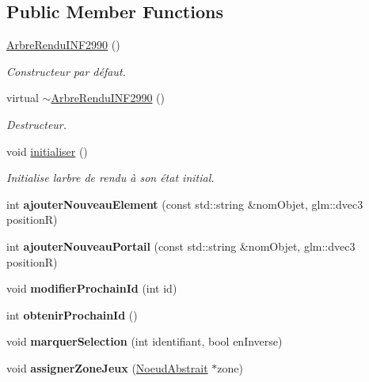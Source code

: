 \subsection*{Public Member Functions}
\begin{DoxyCompactItemize}
\item 
\hyperlink{group__inf2990_ga67528b7fa54e8ef8f96ef2e0bad06d2d}{Arbre\+Rendu\+I\+N\+F2990} ()
\begin{DoxyCompactList}\small\item\em Constructeur par défaut. \end{DoxyCompactList}\item 
virtual \hyperlink{group__inf2990_gaa67526b2fd719f6bcef7a4547bd25c7b}{$\sim$\+Arbre\+Rendu\+I\+N\+F2990} ()
\begin{DoxyCompactList}\small\item\em Destructeur. \end{DoxyCompactList}\item 
void \hyperlink{group__inf2990_ga678d89e1f12ae16ee7dcf6de3db637a3}{initialiser} ()
\begin{DoxyCompactList}\small\item\em Initialise l\textquotesingle{}arbre de rendu à son état initial. \end{DoxyCompactList}\item 
int {\bfseries ajouter\+Nouveau\+Element} (const std\+::string \&nom\+Objet, glm\+::dvec3 positionR)
\item 
int {\bfseries ajouter\+Nouveau\+Portail} (const std\+::string \&nom\+Objet, glm\+::dvec3 positionR)
\item 
\hypertarget{class_arbre_rendu_i_n_f2990_a00fc30fb9a84c745a7a73007e66fce74}{}\label{class_arbre_rendu_i_n_f2990_a00fc30fb9a84c745a7a73007e66fce74} 
void {\bfseries modifier\+Prochain\+Id} (int id)
\item 
\hypertarget{class_arbre_rendu_i_n_f2990_aa9fa6c79c277ea85540bb8e80e7cbac9}{}\label{class_arbre_rendu_i_n_f2990_aa9fa6c79c277ea85540bb8e80e7cbac9} 
int {\bfseries obtenir\+Prochain\+Id} ()
\item 
void {\bfseries marquer\+Selection} (int identifiant, bool en\+Inverse)
\item 
void {\bfseries assigner\+Zone\+Jeux} (\hyperlink{class_noeud_abstrait}{Noeud\+Abstrait} $\ast$zone)
\end{DoxyCompactItemize}
